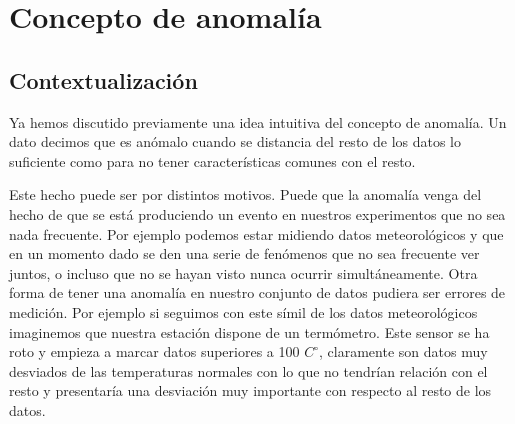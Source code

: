\chapter{Concepto de anomalía}
\label{chapter:anomalia}

\section{Contextualización}

Ya hemos discutido previamente una idea intuitiva del concepto de anomalía. Un dato decimos que es anómalo cuando se distancia del resto de los datos lo suficiente como para no tener características comunes con el resto.

Este hecho puede ser por distintos motivos. Puede que la anomalía venga del hecho de que se está produciendo un evento en nuestros experimentos que no sea nada frecuente. Por ejemplo podemos estar midiendo datos meteorológicos y que en un momento dado se den una serie de fenómenos que no sea frecuente ver juntos, o incluso que no se hayan visto nunca ocurrir simultáneamente. Otra forma de tener una anomalía en nuestro conjunto de datos pudiera ser errores de medición. Por ejemplo si seguimos con este símil de los datos meteorológicos imaginemos que nuestra estación dispone de un termómetro. Este sensor se ha roto y empieza a marcar datos superiores a 100 $C^\circ$, claramente son datos muy desviados de las temperaturas normales con lo que no tendrían relación con el resto y presentaría una desviación muy importante con respecto al resto de los datos.

